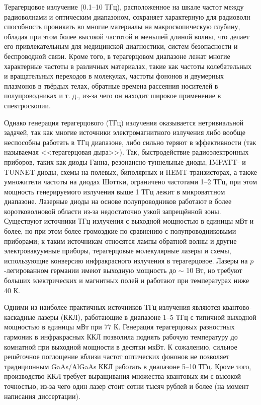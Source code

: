 {\actuality} 
Терагерцовое излучение (0.1--10 ТГц), расположенное на шкале частот между радиоволнами и оптическим диапазоном, сохраняет характерную для радиоволн способность проникать во многие материалы на макроскопическую глубину, обладая при этом более высокой частотой и меньшей длиной волны, что делает его привлекательным для медицинской диагностики, систем безопасности и беспроводной связи. Кроме того, в терагерцовом диапазоне лежат многие характерные частоты в различных материалах, такие как частоты колебательных и вращательных переходов в молекулах, частоты фононов и двумерных плазмонов в твёрдых телах, обратные времена рассеяния носителей в полупроводниках и т. д., из-за чего он находит широкое применение в спектроскопии.

Однако генерация терагерцового (ТГц) излучения оказывается нетривиальной задачей, так как многие источники электромагнитного излучения либо вообще неспособны работать в ТГц диапазоне, либо сильно теряют в эффективности (так называемая <<терагерцовая дыра>>). Так, быстродействие радиоэлектронных приборов, таких как диоды Ганна, резонансно-туннельные диоды, IMPATT- и TUNNET-диоды, схемы на полевых, биполярных и HEMT-транзисторах, а также умножители частоты на диодах Шоттки, ограничено частотами 1--2 ТГц, при этом мощность генерируемого излучения выше 1 ТГц лежит в микроваттном диапазоне. Лазерные диоды на основе полупроводников \AIIIBV{} работают в более коротковолновой области из-за недостаточно узкой запрещённой зоны. Существуют источники ТГц излучения с выходной мощностью в единицы мВт и более, но при этом более громоздкие по сравнению с полупроводниковыми приборами; к таким источникам относятся лампы обратной волны и другие электровакуумные приборы, терагерцовые молекулярные лазеры и схемы, использующие конверсию инфракрасного излучения в терагерцовое. Лазеры на $p$-легированном германии имеют выходную мощность до $\sim$ 10 Вт, но требуют больших электрических и магнитных полей и работают при температурах ниже 40 К.

Одними из наиболее практичных источников ТГц излучения являются квантово-каскадные лазеры (ККЛ), работающие в диапазоне 1--5 ТГц с типичной выходной мощностью в единицы мВт при 77 К. Генерация терагерцовых разностных гармоник в инфракрасных ККЛ позволила поднять рабочую температуру до комнатной при выходной мощности в десятки мкВт. К сожалению, сильное решёточное поглощение вблизи частот оптических фононов не позволяет традиционным GaAs/AlGaAs ККЛ работать в диапазоне 5--10 ТГц. Кроме того, производство ККЛ требует выращивания множества квантовых ям с высокой точностью, из-за чего один лазер стоит сотни тысяч рублей и более (на момент написания диссертации).

